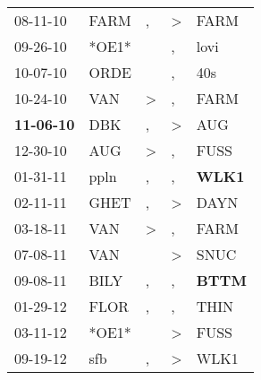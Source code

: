 \begin{supertabular}{p{0.07\textwidth}p{0.06\textwidth}p{0.02\textwidth}p{0.02\textwidth}p{0.06\textwidth}}
          08-11-10\textsuperscript{} &           FARM\textsuperscript{} &                , &     \textgreater &           FARM\textsuperscript{} \\
          09-26-10\textsuperscript{} &                            *OE1* &                  &                , &           lovi\textsuperscript{} \\
          10-07-10\textsuperscript{} &           ORDE\textsuperscript{} &                  &                , &            40s\textsuperscript{} \\
          10-24-10\textsuperscript{} &            VAN\textsuperscript{} &     \textgreater &                , &           FARM\textsuperscript{} \\
 \textbf{11-06-10\textsuperscript{}} &            DBK\textsuperscript{} &                , &     \textgreater &            AUG\textsuperscript{} \\
          12-30-10\textsuperscript{} &            AUG\textsuperscript{} &     \textgreater &                , &           FUSS\textsuperscript{} \\
          01-31-11\textsuperscript{} &           ppln\textsuperscript{} &                , &                , &  \textbf{WLK1\textsuperscript{}} \\
          02-11-11\textsuperscript{} &           GHET\textsuperscript{} &                , &     \textgreater &           DAYN\textsuperscript{} \\
          03-18-11\textsuperscript{} &            VAN\textsuperscript{} &     \textgreater &                , &           FARM\textsuperscript{} \\
          07-08-11\textsuperscript{} &            VAN\textsuperscript{} &                  &     \textgreater &           SNUC\textsuperscript{} \\
          09-08-11\textsuperscript{} &           BILY\textsuperscript{} &                , &                , &  \textbf{BTTM\textsuperscript{}} \\
          01-29-12\textsuperscript{} &           FLOR\textsuperscript{} &                , &                , &           THIN\textsuperscript{} \\
          03-11-12\textsuperscript{} &                            *OE1* &                  &     \textgreater &           FUSS\textsuperscript{} \\
          09-19-12\textsuperscript{} &            sfb\textsuperscript{} &                , &     \textgreater &           WLK1\textsuperscript{} \\

\end{supertabular}
